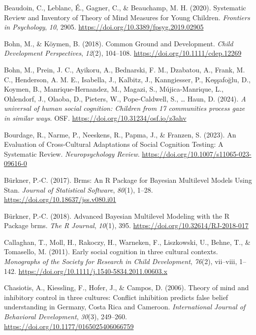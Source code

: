\documentclass[
  man,floatsintext]{apa7}
\newlength{\cslhangindent}
\newenvironment{CSLReferences}[2] %
 {\begin{list}{}{%
  \setlength{\itemindent}{0pt}
  \setlength{\leftmargin}{0pt}
  \setlength{\parsep}{0pt}
  \ifodd #1
   \setlength{\leftmargin}{\cslhangindent}
   \setlength{\itemindent}{-1\cslhangindent}
  \fi
  \setlength{\itemsep}{#2\baselineskip}}}
 {\end{list}}
\begin{document}
\label{refs}
\begin{CSLReferences}{1}{0}
Beaudoin, C., Leblanc, É., Gagner, C., \& Beauchamp, M. H. (2020). Systematic {Review} and {Inventory} of {Theory} of {Mind Measures} for {Young Children}. \emph{Frontiers in Psychology}, \emph{10}, 2905. \url{https://doi.org/10.3389/fpsyg.2019.02905}

Bohn, M., \& Köymen, B. (2018). Common {Ground} and {Development}. \emph{Child Development Perspectives}, \emph{12}(2), 104--108. \url{https://doi.org/10.1111/cdep.12269}

Bohn, M., Prein, J. C., Ayikoru, A., Bednarski, F. M., Dzabatou, A., Frank, M. C., Henderson, A. M. E., Isabella, J., Kalbitz, J., Kanngiesser, P., Keşşafoğlu, D., Koymen, B., Manrique-Hernandez, M., Magazi, S., Mújica-Manrique, L., Ohlendorf, J., Olaoba, D., Pieters, W., Pope-Caldwell, S., \ldots{} Haun, D. (2024). \emph{A universal of human social cognition: {Children} from 17 communities process gaze in similar ways}. OSF. \url{https://doi.org/10.31234/osf.io/z3ahv}

Bourdage, R., Narme, P., Neeskens, R., Papma, J., \& Franzen, S. (2023). An {Evaluation} of {Cross-Cultural Adaptations} of {Social Cognition Testing}: {A Systematic Review}. \emph{Neuropsychology Review}. \url{https://doi.org/10.1007/s11065-023-09616-0}

Bürkner, P.-C. (2017). Brms: {An R Package} for {Bayesian Multilevel Models Using Stan}. \emph{Journal of Statistical Software}, \emph{80}(1), 1--28. \url{https://doi.org/10.18637/jss.v080.i01}

Bürkner, P.-C. (2018). Advanced {Bayesian Multilevel Modeling} with the {R Package} brms. \emph{The R Journal}, \emph{10}(1), 395. \url{https://doi.org/10.32614/RJ-2018-017}

Callaghan, T., Moll, H., Rakoczy, H., Warneken, F., Liszkowski, U., Behne, T., \& Tomasello, M. (2011). Early social cognition in three cultural contexts. \emph{Monographs of the Society for Research in Child Development}, \emph{76}(2), vii--viii, 1--142. \url{https://doi.org/10.1111/j.1540-5834.2011.00603.x}

Chasiotis, A., Kiessling, F., Hofer, J., \& Campos, D. (2006). Theory of mind and inhibitory control in three cultures: {Conflict} inhibition predicts false belief understanding in {Germany}, {Costa Rica} and {Cameroon}. \emph{International Journal of Behavioral Development}, \emph{30}(3), 249--260. \url{https://doi.org/10.1177/0165025406066759}


\end{CSLReferences}
\end{document}
